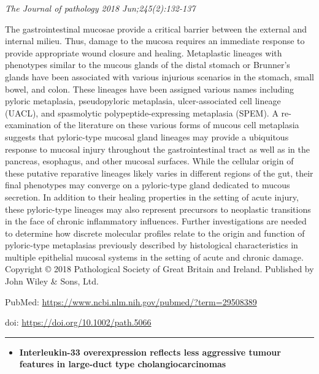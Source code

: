 \documentclass[]{article}
\providecommand{\tightlist}{%
  \setlength{\itemsep}{0pt}\setlength{\parskip}{0pt}}
\begin{document}
\emph{The Journal of pathology 2018 Jun;245(2):132-137}

The gastrointestinal mucosae provide a critical barrier between the
external and internal milieu. Thus, damage to the mucosa requires an
immediate response to provide appropriate wound closure and healing.
Metaplastic lineages with phenotypes similar to the mucous glands of the
distal stomach or Brunner's glands have been associated with various
injurious scenarios in the stomach, small bowel, and colon. These
lineages have been assigned various names including pyloric metaplasia,
pseudopyloric metaplasia, ulcer-associated cell lineage (UACL), and
spasmolytic polypeptide-expressing metaplasia (SPEM). A re-examination
of the literature on these various forms of mucous cell metaplasia
suggests that pyloric-type mucosal gland lineages may provide a
ubiquitous response to mucosal injury throughout the gastrointestinal
tract as well as in the pancreas, esophagus, and other mucosal surfaces.
While the cellular origin of these putative reparative lineages likely
varies in different regions of the gut, their final phenotypes may
converge on a pyloric-type gland dedicated to mucous secretion. In
addition to their healing properties in the setting of acute injury,
these pyloric-type lineages may also represent precursors to neoplastic
transitions in the face of chronic inflammatory influences. Further
investigations are needed to determine how discrete molecular profiles
relate to the origin and function of pyloric-type metaplasias previously
described by histological characteristics in multiple epithelial mucosal
systems in the setting of acute and chronic damage. Copyright © 2018
Pathological Society of Great Britain and Ireland. Published by John
Wiley \& Sons, Ltd.

PubMed: \url{https://www.ncbi.nlm.nih.gov/pubmed/?term=29508389}

doi: \url{https://doi.org/10.1002/path.5066}

{}

{}

\begin{center}\rule{0.5\linewidth}{\linethickness}\end{center}

\begin{itemize}
\tightlist
\item
  \textbf{Interleukin-33 overexpression reflects less aggressive tumour
  features in large-duct type cholangiocarcinomas}
\end{itemize}
\end{document}

